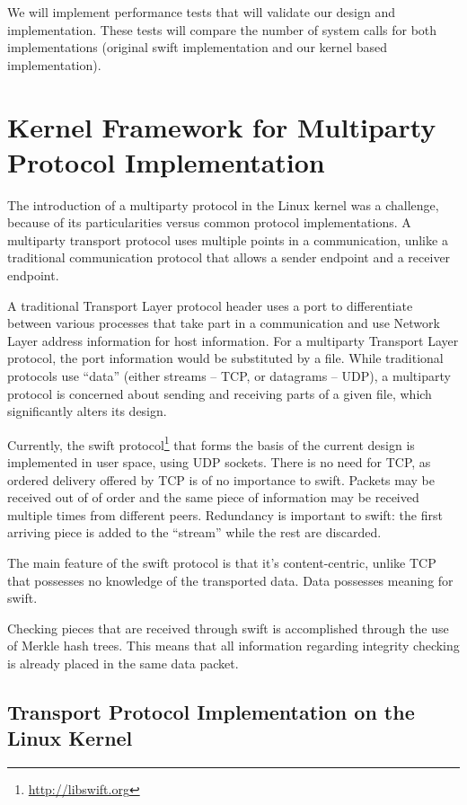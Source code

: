 We will implement performance tests that will validate our design and
implementation. These tests will compare the number of system calls for both
implementations (original swift implementation and our kernel based
implementation).

\section{Kernel Framework for Multiparty Protocol Implementation}
\label{sec:multiparty:kernel-framework}

The introduction of a multiparty protocol in the Linux kernel was a challenge,
because of its particularities versus common protocol implementations. A
multiparty transport protocol uses multiple points in a communication, unlike
a traditional communication protocol that allows a sender endpoint and a
receiver endpoint.

A traditional Transport Layer protocol header uses a port to differentiate
between various processes that take part in a communication and use Network
Layer address information for host information. For a multiparty Transport
Layer protocol, the port information would be substituted by a file. While
traditional protocols use ``data'' (either streams -- TCP, or datagrams --
UDP), a multiparty protocol is concerned about sending and receiving parts of
a given file, which significantly alters its design.

Currently, the swift protocol\footnote{\url{http://libswift.org}} that forms the
basis of the current design is implemented in user space, using UDP sockets.
There is no need for TCP, as ordered delivery offered by TCP is of no
importance to swift.  Packets may be received out of of order and the same
piece of information may be received multiple times from different peers.
Redundancy is important to swift: the first arriving piece is added to the
``stream'' while the rest are discarded.

The main feature of the swift protocol is that it's content-centric, unlike
TCP that possesses no knowledge of the transported data. Data possesses
meaning for swift.

Checking pieces that are received through swift is accomplished through the
use of Merkle hash trees. This means that all information
regarding integrity checking is already placed in the same data packet.


\subsection{Transport Protocol Implementation on the Linux Kernel}


